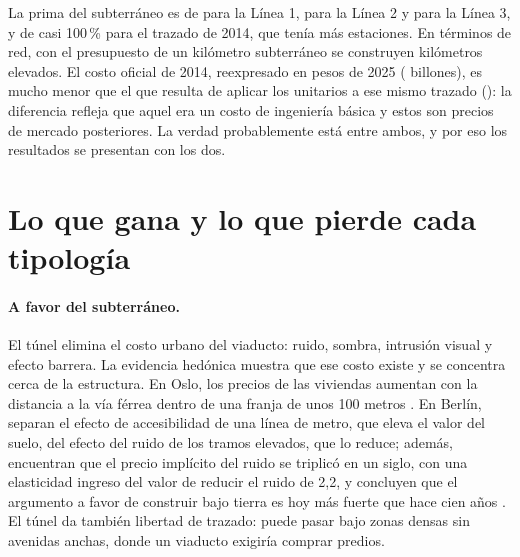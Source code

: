\begin{table}[ht]
\centering\small
\caption{CAPEX y O\&M de las tipologías elevada y subterránea con los costos unitarios de 2023
(billones de pesos de 2025, sin sobrecostos).}\label{tab:metro_costos}
\resizebox{\textwidth}{!}{}
\end{table}

La prima del subterráneo es de \PrimaLuno{} para la Línea 1, \PrimaLdos{} para la Línea 2 y
\PrimaLtres{} para la Línea 3, y de casi 100\,\% para el trazado de 2014, que tenía más estaciones. En
términos de red, con el presupuesto de un kilómetro subterráneo se construyen \KmPorKm{} kilómetros
elevados. El costo oficial de 2014, reexpresado en pesos de 2025 (\CapexSubOficial{} billones), es
mucho menor que el que resulta de aplicar los unitarios a ese mismo trazado (\CapexSubUnitarios): la
diferencia refleja que aquel era un costo de ingeniería básica y estos son precios de mercado
posteriores. La verdad probablemente está entre ambos, y por eso los resultados se presentan con los
dos.

\section{Lo que gana y lo que pierde cada tipología}

\paragraph{A favor del subterráneo.} El túnel elimina el costo urbano del viaducto: ruido, sombra,
intrusión visual y efecto barrera. La evidencia hedónica muestra que ese costo existe y se concentra
cerca de la estructura. En Oslo, los precios de las viviendas aumentan con la distancia a la vía
férrea dentro de una franja de unos 100 metros \citep{strand2001}. En Berlín, \citet{ahlfeldt2016}
separan el efecto de accesibilidad de una línea de metro, que eleva el valor del suelo, del efecto del
ruido de los tramos elevados, que lo reduce; además, encuentran que el precio implícito del ruido se
triplicó en un siglo, con una elasticidad ingreso del valor de reducir el ruido de 2,2, y concluyen
que el argumento a favor de construir bajo tierra es hoy más fuerte que hace cien años
\citep{ahlfeldt2019}. El túnel da también libertad de trazado: puede pasar bajo zonas densas sin
avenidas anchas, donde un viaducto exigiría comprar predios.


